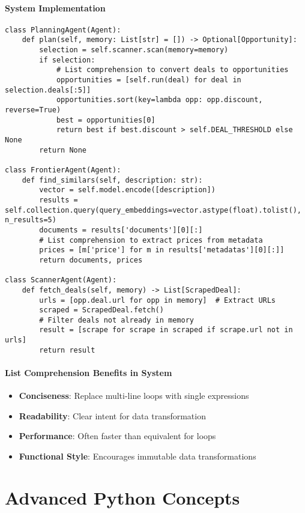 \paragraph{System Implementation}
\begin{lstlisting}[caption=List Comprehensions in Agent System]
class PlanningAgent(Agent):
    def plan(self, memory: List[str] = []) -> Optional[Opportunity]:
        selection = self.scanner.scan(memory=memory)
        if selection:
            # List comprehension to convert deals to opportunities
            opportunities = [self.run(deal) for deal in selection.deals[:5]]
            opportunities.sort(key=lambda opp: opp.discount, reverse=True)
            best = opportunities[0]
            return best if best.discount > self.DEAL_THRESHOLD else None
        return None

class FrontierAgent(Agent):
    def find_similars(self, description: str):
        vector = self.model.encode([description])
        results = self.collection.query(query_embeddings=vector.astype(float).tolist(), n_results=5)
        documents = results['documents'][0][:]
        # List comprehension to extract prices from metadata
        prices = [m['price'] for m in results['metadatas'][0][:]]
        return documents, prices

class ScannerAgent(Agent):
    def fetch_deals(self, memory) -> List[ScrapedDeal]:
        urls = [opp.deal.url for opp in memory]  # Extract URLs
        scraped = ScrapedDeal.fetch()
        # Filter deals not already in memory
        result = [scrape for scrape in scraped if scrape.url not in urls]
        return result
\end{lstlisting}

\paragraph{List Comprehension Benefits in System}
\begin{itemize}
\item \textbf{Conciseness}: Replace multi-line loops with single expressions
\item \textbf{Readability}: Clear intent for data transformation
\item \textbf{Performance}: Often faster than equivalent for loops
\item \textbf{Functional Style}: Encourages immutable data transformations
\end{itemize}

\section{Advanced Python Concepts}

